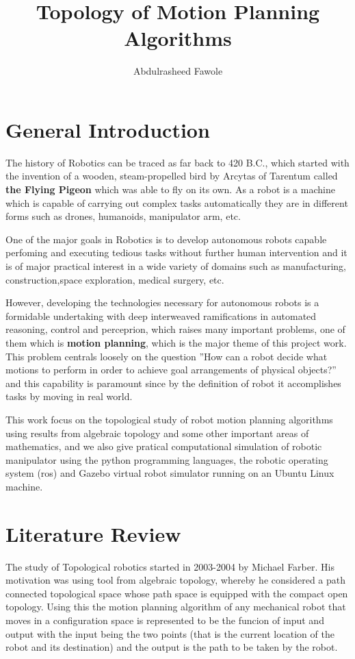 \documentclass[a4paper, 12pt]{scrartcl}
\title{Topology of Motion Planning Algorithms}
\author{Abdulrasheed Fawole}
\theoremstyle{definition}
\begin{document}
\baselineskip24pt
    \maketitle
    \section{General Introduction}
    The history of Robotics can be traced as far back to 420 B.C., which started with the invention of a wooden, steam-propelled bird by Arcytas of Tarentum called \textbf{the Flying Pigeon} which was able to fly on its own.
    As a robot is a machine which is capable of carrying out complex tasks automatically they are in different forms such as drones, humanoids, manipulator arm, etc.

    One of the major goals in Robotics is to develop autonomous robots capable perfoming and executing tedious tasks without further human intervention and it is of major practical interest in a wide variety of domains such as manufacturing, construction,space exploration, medical surgery, etc.

    However, developing the technologies necessary for autonomous robots is a formidable undertaking with deep interweaved ramifications in automated reasoning, control and perceprion, which raises many important problems, one of them which is \textbf{motion planning}, which is the major theme of this project work. This problem centrals loosely on the question ''How can a robot decide what motions to perform in order to achieve goal arrangements of physical objects?'' and this capability is paramount since by the definition of robot it accomplishes tasks by moving in real world.
    
    This work focus on the topological study of robot motion planning algorithms using results from algebraic topology and some other important areas of mathematics, and we also give pratical computational simulation of robotic manipulator using the python programming languages, the robotic operating system (ros) and Gazebo virtual robot simulator running on an Ubuntu Linux machine.
    
    \section{Literature Review}
    The study of Topological robotics started in 2003-2004 by Michael Farber. His motivation was using tool from algebraic topology, whereby he considered a path connected topological space whose path space is equipped with the compact open topology. Using this the motion planning algorithm of any mechanical robot that moves in a configuration space is represented to be the funcion of input and output with the input being the two points (that is the current location of the robot and its destination) and the output is the path to be taken by the robot.
\end{document}
